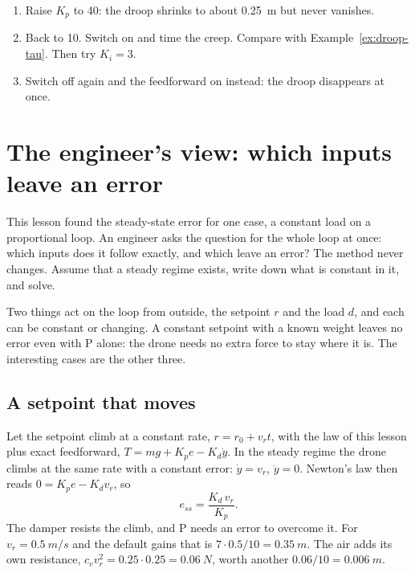 \begin{trythis}
\begin{enumerate}
  \item Raise $K_p$ to 40: the droop shrinks to about \SI{0.25}{m} but never vanishes.
  \item Back to 10. Switch \It on and time the creep. Compare with Example~\ref{ex:droop-tau}. Then try $K_i = 3$.
  \item Switch \It off again and the feedforward on instead: the droop disappears at once.
\end{enumerate}
\end{trythis}

\section{The engineer's view: which inputs leave an error}

This lesson found the steady-state error for one case, a constant load on a proportional loop. An engineer asks the question for the whole loop at once: which inputs does it follow exactly, and which leave an error? The method never changes. Assume that a steady regime exists, write down what is constant in it, and solve.

Two things act on the loop from outside, the setpoint $r$ and the load $d$, and each can be constant or changing. A constant setpoint with a known weight leaves no error even with P alone: the drone needs no extra force to stay where it is. The interesting cases are the other three.

\subsection{A setpoint that moves}
Let the setpoint climb at a constant rate, $r = r_0 + v_r t$, with the law of this lesson plus exact feedforward, $T = mg + K_p e - K_d\dot y$. In the steady regime the drone climbs at the same rate with a constant error: $\dot y = v_r$, $\ddot y = 0$. Newton's law then reads $0 = K_p e - K_d v_r$, so
\begin{equation}\label{eq:droop-ramp}
  e_{ss} = \frac{K_d\,v_r}{K_p} .
\end{equation}
The damper resists the climb, and P needs an error to overcome it. For $v_r = \SI{0.5}{m/s}$ and the default gains that is $7 \cdot 0.5/10 = \SI{0.35}{m}$. The air adds its own resistance, $c_v v_r^2 = 0.25 \cdot 0.25 = \SI{0.06}{N}$, worth another $0.06/10 = \SI{0.006}{m}$.

